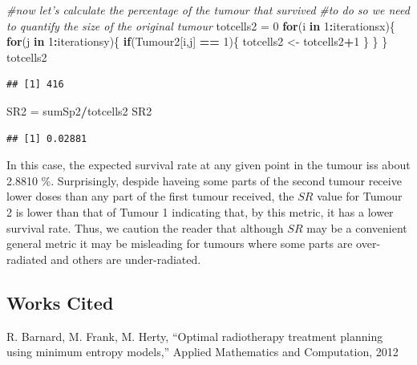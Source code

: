 \documentclass[]{article}
\newenvironment{Shaded}{\begin{snugshade}}{\end{snugshade}}
\newcommand{\DecValTok}[1]{\textcolor[rgb]{0.00,0.00,0.81}{#1}}
\newcommand{\StringTok}[1]{\textcolor[rgb]{0.31,0.60,0.02}{#1}}
\newcommand{\CommentTok}[1]{\textcolor[rgb]{0.56,0.35,0.01}{\textit{#1}}}
\newcommand{\ControlFlowTok}[1]{\textcolor[rgb]{0.13,0.29,0.53}{\textbf{#1}}}
\newcommand{\OperatorTok}[1]{\textcolor[rgb]{0.81,0.36,0.00}{\textbf{#1}}}
\newcommand{\NormalTok}[1]{#1}
\begin{document}
\begin{Shaded}
\begin{Highlighting}[]
\CommentTok{#now let's calculate the percentage of the tumour that survived}
\CommentTok{#to do so we need  to quantify the size  of the original tumour}
\NormalTok{totcells2 =}\StringTok{ }\DecValTok{0}
\ControlFlowTok{for}\NormalTok{(i }\ControlFlowTok{in} \DecValTok{1}\OperatorTok{:}\NormalTok{iterationsx)\{}
  \ControlFlowTok{for}\NormalTok{(j }\ControlFlowTok{in} \DecValTok{1}\OperatorTok{:}\NormalTok{iterationsy)\{}
    \ControlFlowTok{if}\NormalTok{(Tumour2[i,j] }\OperatorTok{==}\StringTok{ }\DecValTok{1}\NormalTok{)\{}
\NormalTok{      totcells2 <-}\StringTok{ }\NormalTok{totcells2}\OperatorTok{+}\DecValTok{1}
\NormalTok{    \}}
\NormalTok{  \}}
\NormalTok{\}}
\NormalTok{totcells2}
\end{Highlighting}
\end{Shaded}

\begin{verbatim}
## [1] 416
\end{verbatim}

\begin{Shaded}
\begin{Highlighting}[]
\NormalTok{SR2 =}\StringTok{ }\NormalTok{sumSp2}\OperatorTok{/}\NormalTok{totcells2}
\NormalTok{SR2}
\end{Highlighting}
\end{Shaded}

\begin{verbatim}
## [1] 0.02881
\end{verbatim}

In this case, the expected survival rate at any given point in the
tumour iss about 2.8810 \%. Surprisingly, despide haveing some parts of
the second tumour receive lower doses than any part of the first tumour
received, the \(SR\) value for Tumour 2 is lower than that of Tumour 1
indicating that, by this metric, it has a lower survival rate. Thus, we
caution the reader that although \(SR\) may be a convenient general
metric it may be misleading for tumours where some parts are
over-radiated and others are under-radiated.

\subsection{Works Cited}\label{works-cited}

R. Barnard, M. Frank, M. Herty, ``Optimal radiotherapy treatment
planning using minimum entropy models,'' Applied Mathematics and
Computation, 2012
\end{document}
